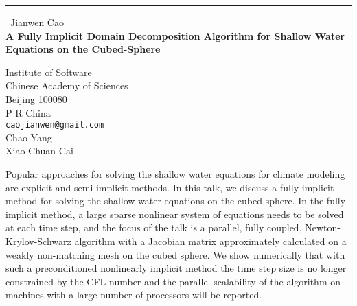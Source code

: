 \documentclass{report}
\begin{document}
\begin{center}
\rule{6in}{1pt} \
{\large Jianwen Cao \\
{\bf A Fully Implicit Domain Decomposition Algorithm for Shallow Water Equations on the Cubed-Sphere}}

Institute of Software \\ Chinese Academy of Sciences \\ Beijing 100080 \\ P R China
\\
{\tt caojianwen@gmail.com}\\
Chao Yang\\
Xiao-Chuan Cai\end{center}

Popular approaches for solving the shallow water equations
for climate modeling are explicit and semi-implicit methods.
In this talk, we discuss a fully implicit method for solving the shallow
water equations on the cubed sphere. In the fully
implicit method, a large sparse nonlinear system of equations
needs to be solved at each time step, and the focus of the talk is a
parallel, fully coupled, Newton-Krylov-Schwarz algorithm
with a Jacobian matrix approximately calculated on a weakly
non-matching mesh on the cubed sphere. We show numerically
that with such a preconditioned nonlinearly implicit method the
time step size is no longer constrained by the CFL number and
the parallel scalability of the algorithm on machines with
a large number of processors will be reported.
\end{document}
